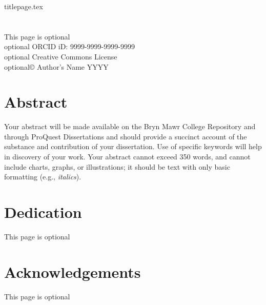 \documentclass[12pt]{report}
\begin{document}
{titlepage.tex} %
\chapter*{}
\vspace*{\fill}
\begin{center}
\begin{singlespace}
This page is optional\\

optional ORCID iD:  9999-9999-9999-9999\\
optional Creative Commons License \\
optional© Author's Name YYYY\\
\end{singlespace}
\end{center}
\vspace*{\fill}
\chapter*{Abstract}
\indent \indent Your abstract will be made available on the Bryn Mawr College Repository and
through ProQuest Dissertations and should provide a succinct account of the substance
and contribution of your dissertation. Use of specific keywords will help in discovery of
your work. Your abstract cannot exceed 350 words, and cannot include charts, graphs, or
illustrations; it should be text with only basic formatting (e.g., \textit{italics}).
\setcounter{page}{2}
\chapter*{Dedication}
\begin{center}
    This page is optional
\end{center}
\chapter*{Acknowledgements}
\begin{center}
    This page is optional
\end{center}
\tableofcontents
\newpage
\listoffigures
\newpage
\listoftables
\newpage
\listofappendices
\newpage
{}
\end{document}
